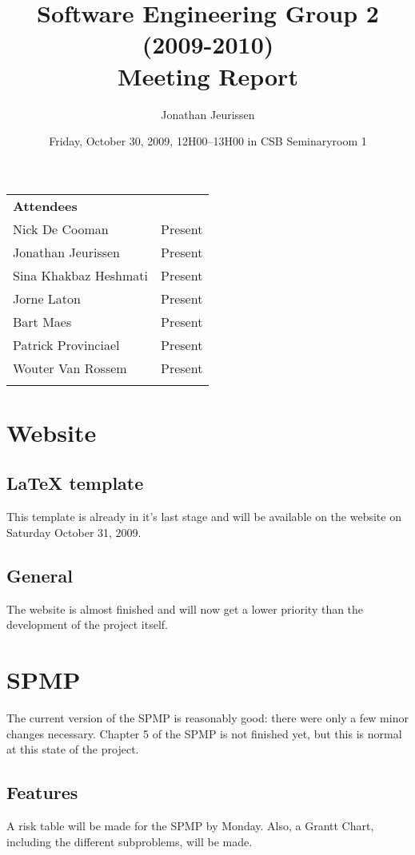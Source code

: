 \documentclass[a4paper, 12pt]{article}
\title{Software Engineering Group 2 (2009-2010) \\Meeting Report}
\author{Jonathan Jeurissen}
\date{ Friday, October 30, 2009, 12H00--13H00 in CSB Seminaryroom 1}
\begin{document}
	\maketitle
	
	\begin{tabular}{l l}
		{\large \textbf{Attendees}} \\
		Nick De Cooman & Present \\
		Jonathan Jeurissen & Present \\
		Sina Khakbaz Heshmati & Present \\
		Jorne Laton & Present \\
		Bart Maes & Present \\
		Patrick Provinciael & Present \\
		Wouter Van Rossem & Present \\
		\\
	\end{tabular}	
	
	
	
	
	\section{Website}
	
	\subsection{\LaTeX{} template}
		This template is already in it's last stage and will be available on the website on Saturday October 31, 2009.
	\subsection{General}
The website is almost finished and will now get a lower priority than the development of the project itself.
	\section{SPMP}
The current version of the SPMP is reasonably good: there were only a few minor changes necessary. Chapter 5 of the SPMP is not finished yet, but this is normal at this state of the project.
	\subsection{Features}
A risk table will be made for the SPMP by Monday. Also, a Grantt Chart, including the different subproblems, will be made.
\end{document}
